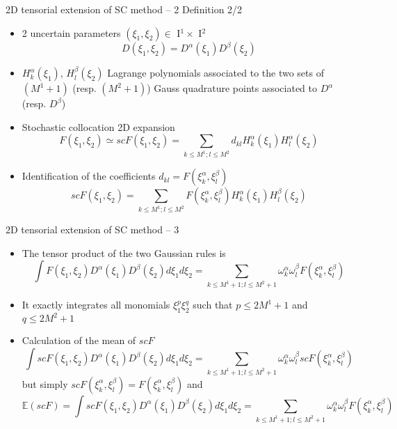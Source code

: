 \documentclass[10pt]{beamer}
\def\begit{\begin{itemize}}
\def\endit{\end{itemize}}
\def\Ir{{\textrm I}}
\newcommand{\esp}{{\mathbb E}}
\begin{document}
%
%
%
\begin{frame}{2D tensorial extension of SC method -- 2}{ Definition 2/2}
%
\footnotesize{
%
\begit
%
\item 2 uncertain parameters  $(\xi_1,\xi_2) \in$ \Ir$^1 \times$ \Ir$^2 $ 
%
                   $$ D(\xi_1,\xi_2) = D^{\alpha}(\xi_1)D^{\beta}(\xi_2)$$ 
%
\item $H_k^\alpha(\xi_1)$, $H_l^\beta(\xi_2)$ Lagrange polynomials associated to the two sets of $(M^1+1)$ (resp.  $(M^2+1)$) Gauss quadrature points associated to  $D^{\alpha}$  
 (resp. $D^{\beta}$)
% 
\item Stochastic collocation 2D expansion 
  $$    F(\xi_1,\xi_2) \simeq scF(\xi_1,\xi_2)  = \sum_{k \leq M^1 ; l\leq M^2} d_{kl}  H_k^\alpha(\xi_1) H_l^\alpha(\xi_2)    $$
%
\item Identification of the coefficients $d_{kl}=F(\xi^\alpha_k,\xi^\beta_l)$
  $$  scF(\xi_1,\xi_2)  = \sum_{k \leq M^1 ; l\leq M^2}  F(\xi^\alpha_k,\xi^\beta_l) H_k^\alpha(\xi_1) H_l^\beta(\xi_2)     $$  
\endit
%
}
%
\end{frame}
%
%
\begin{frame}{2D tensorial extension of SC method -- 3}
%
\footnotesize{
%
\begit
%
\item The tensor product of the two Gaussian rules is 
%
    $$ \int  F(\xi_1,\xi_2) D^\alpha(\xi_1) D^\beta(\xi_2) d\xi_1 d\xi_2 = \sum_{k \leq M^1+1 ; l\leq M^2+1} \omega^\alpha_k \omega^\beta_l F(\xi^\alpha_k,\xi^\beta_l) $$
%
\item It exactly integrates all monomials $ \xi_ 1^p   \xi_ 2^q $ such that  $p \leq 2M^1 +1$ and $q \leq 2M^2 +1$  
% 
\item Calculation of the mean of $scF$ 
   $$  \int  scF(\xi_1,\xi_2) D^\alpha(\xi_1) D^\beta(\xi_2) d\xi_1 d\xi_2 =  \sum_{k \leq M^1+1 ; l\leq M^2+1} \omega^\alpha_k \omega^\beta_l scF(\xi^\alpha_k,\xi^\beta_l)   $$
%
 but simply    $scF(\xi^\alpha_k,\xi^\beta_l) = F(\xi^\alpha_k,\xi^\beta_l)$ and
%
   $$  \esp(scF) = \int  scF(\xi_1,\xi_2) D^\alpha(\xi_1) D^\beta(\xi_2) d\xi_1 d\xi_2 =  \sum_{k \leq M^1+1 ; l\leq M^2+1} \omega^\alpha_k \omega^\beta_l F(\xi^\alpha_k,\xi^\beta_l)   $$
%
\endit
%
}
%
\end{frame}
%
\end{document}
